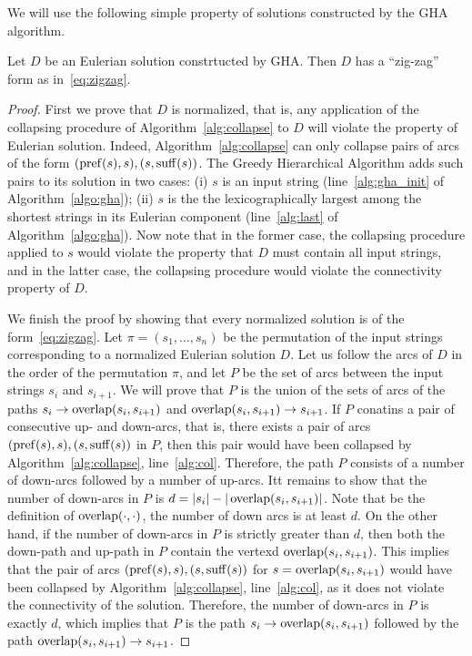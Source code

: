 We will use the following simple property of solutions constructed by the GHA algorithm.
\begin{claim}
\label{claim:zigzag}
Let $D$ be an Eulerian solution constrtucted by GHA. Then $D$ has a ``zig-zag'' form as in~\eqref{eq:zigzag}. 
\end{claim}
\begin{proof}
First we prove that $D$ is normalized, that is, any application of the collapsing procedure of Algorithm~\ref{alg:collapse} to $D$ will violate the property of Eulerian solution. Indeed, Algorithm~\ref{alg:collapse} can only collapse pairs of arcs of the form $(\operatorname{pref}(s), s), (s, \operatorname{suff}(s))$. The Greedy Hierarchical Algorithm adds such pairs to its solution in two cases: (i) $s$ is an input string (line~\ref{alg:gha_init} of Algorithm~\ref{algo:gha}); (ii) $s$ is the the lexicographically largest among the shortest strings in its Eulerian component (line~\ref{alg:last} of Algorithm~\ref{algo:gha}). Now note that in the former case, the collapsing procedure applied to $s$ would violate the property that $D$ must contain all input strings, and in the latter case, the collapsing procedure would violate the connectivity property of $D$.

We finish the proof by showing that every normalized solution is of the form~\eqref{eq:zigzag}. Let $\pi=(s_1, \dots, s_n)$ be  the permutation of the input strings corresponding to a normalized Eulerian solution $D$. Let us follow the arcs of $D$ in the order of the permutation $\pi$, and let $P$ be the set of arcs between the input strings $s_i$ and $s_{i+1}$. We will prove that $P$ is the union of the sets of arcs of the paths $s_i \to \operatorname{overlap}(s_i,s_{i+1})$ and $\operatorname{overlap}(s_i,s_{i+1})\to s_{i+1}$. If $P$ conatins a pair of consecutive up- and down-arcs, that is, there exists a pair of arcs $(\operatorname{pref}(s), s), (s, \operatorname{suff}(s))$ in $P$, then this pair would have been collapsed by Algorithm~\ref{alg:collapse}, line~\ref{alg:col}. Therefore, the path $P$ consists of a number of down-arcs followed by a number of up-arcs. Itt remains to show that the number of down-arcs in $P$ is $d=|s_i|-|\operatorname{overlap}(s_i,s_{i+1})|$. Note that be the definition of $\operatorname{overlap}(\cdot,\cdot)$, the number of down arcs is at least $d$. On the other hand, if the number of down-arcs in $P$ is strictly greater than $d$, then both the down-path and up-path in $P$ contain the vertexd $\operatorname{overlap}(s_i, s_{i+1})$. This implies that the pair of arcs  $(\operatorname{pref}(s), s), (s, \operatorname{suff}(s))$ for $s=\operatorname{overlap}(s_i, s_{i+1})$ would have been collapsed by Algorithm~\ref{alg:collapse}, line~\ref{alg:col}, as it does not violate the connectivity of the solution. Therefore, the number of down-arcs in $P$ is exactly $d$, which implies that $P$ is the path $s_i \to \operatorname{overlap}(s_i,s_{i+1})$ followed by the path $\operatorname{overlap}(s_i,s_{i+1})\to s_{i+1}$.
\end{proof}

